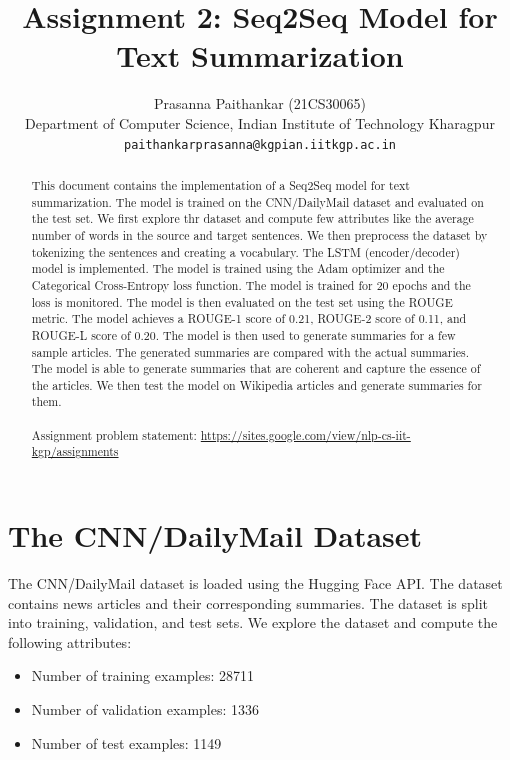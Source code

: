 \documentclass{article}
\title{Assignment 2: Seq2Seq Model for Text Summarization}
\author{%
  Prasanna Paithankar (21CS30065)\\
  Department of Computer Science, Indian Institute of Technology Kharagpur\\
  \texttt{paithankarprasanna@kgpian.iitkgp.ac.in} \\
}
\begin{document}
\maketitle


\begin{abstract}
    This document contains the implementation of a Seq2Seq model for text summarization. The model is trained on the CNN/DailyMail dataset and evaluated on the test set. We first explore thr dataset and compute few attributes like the average number of words in the source and target sentences. We then preprocess the dataset by tokenizing the sentences and creating a vocabulary. The LSTM (encoder/decoder) model is implemented. The model is trained using the Adam optimizer and the Categorical Cross-Entropy loss function. The model is trained for 20 epochs and the loss is monitored. The model is then evaluated on the test set using the ROUGE metric. The model achieves a ROUGE-1 score of 0.21, ROUGE-2 score of 0.11, and ROUGE-L score of 0.20. The model is then used to generate summaries for a few sample articles. The generated summaries are compared with the actual summaries. The model is able to generate summaries that are coherent and capture the essence of the articles. We then test the model on Wikipedia articles and generate summaries for them.     \\
    \\
    Assignment problem statement: \url{https://sites.google.com/view/nlp-cs-iit-kgp/assignments}
\end{abstract}


\section{The CNN/DailyMail Dataset}

The CNN/DailyMail dataset is loaded using the Hugging Face API. The dataset contains news articles and their corresponding summaries. The dataset is split into training, validation, and test sets. We explore the dataset and compute the following attributes:

\begin{itemize}
    \item Number of training examples: 28711
    \item Number of validation examples: 1336
    \item Number of test examples: 1149
\end{itemize}
\end{document}

